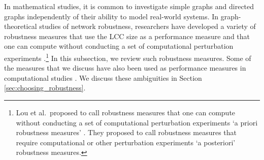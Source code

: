\documentclass{comnet-mod}
\begin{document}
In mathematical studies, it is common to investigate simple graphs and directed graphs independently of their ability to model real-world systems. In graph-theoretical studies of network robustness, researchers have developed a variety of robustness measures that use the LCC size as a performance measure and that one can compute without conducting a set of computational perturbation experiments \cite{Hoory2006, Shang2012, Zheng2022}.\footnote{Lou et al.~proposed to call robustness measures that one can compute without conducting a set of computational perturbation experiments `a priori robustness measures' \cite{Lou2023}. They proposed to call robustness measures that require computational or other perturbation experiments `a posteriori' robustness measures.} In this subsection, we review such robustness measures. Some of the measures that we discuss have also been used as performance measures in computational studies \cite{Eubank2004, Wu2010a, Zhang2013b, Wang2014b, Cozzo2018, Yamashita2019}. We discuss these ambiguities in Section \ref{sec:choosing_robustness}.
\end{document}
